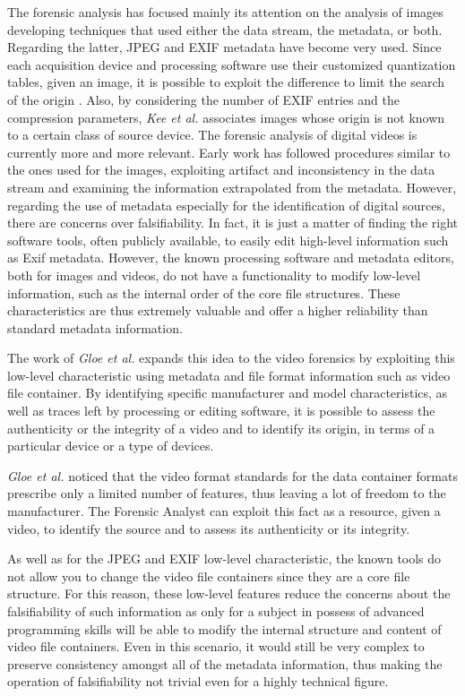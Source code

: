 The forensic analysis has focused mainly its attention on the analysis of images developing techniques that used either the data stream, the metadata, or both. Regarding the latter, JPEG \cite{jpeg} and EXIF \cite{exif} metadata have become very used. Since each acquisition device and processing software use their customized quantization tables, given an image, it is possible to exploit the difference to limit the search of the origin \cite{farid}. Also, by considering the number of EXIF entries and the compression parameters, \emph{Kee et al.} \cite{kee2001} associates images whose origin is not known to a certain class of source device.
The forensic analysis of digital videos is currently more and more relevant. Early work has followed procedures similar to the ones used for the images, exploiting artifact and inconsistency in the data stream and examining the information extrapolated from the metadata.
However, regarding the use of metadata especially for the identification of digital sources, there are concerns over falsifiability. In fact, it is just a matter of finding the right software tools, often publicly available, to easily edit high-level information such as Exif metadata.
However, the known processing software and metadata editors, both for images and videos, do not have a functionality to modify low-level information, such as the internal order of the core file structures. These characteristics are thus extremely valuable and offer a higher reliability than standard metadata information.

The work of \emph{Gloe et al.} \cite{Gloe2014S68} expands this idea to the video forensics by exploiting this low-level characteristic using metadata and file format information such as video file container. By identifying specific manufacturer and model characteristics, as well as traces left by processing or editing software, it is possible to assess the authenticity or the integrity of a video and to identify its origin, in terms of a particular device or a type of devices.

\emph{Gloe et al.} \cite{Gloe2014S68} noticed that the video format standards for the data container formats prescribe only a limited number of features, thus leaving a lot of freedom to the manufacturer. The Forensic Analyst can exploit this fact as a resource, given a video, to identify the source and to assess its authenticity or its integrity. 

As well as for the JPEG and EXIF low-level characteristic, the known tools do not allow you to change the video file containers since they are a core file structure. For this reason, these low-level features reduce the concerns about the falsifiability of such information as only for a subject in possess of advanced programming skills will be able to modify the internal structure and content of video file containers. Even in this scenario, it would still be very complex to preserve consistency amongst all of the metadata information, thus making the operation of falsifiability not trivial even for a highly technical figure.

